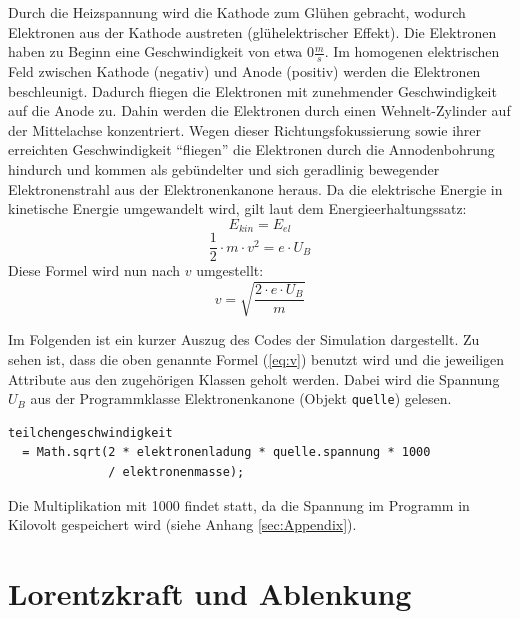 Durch die Heizspannung wird die Kathode zum Glühen gebracht, wodurch Elektronen aus der Kathode austreten (glühelektrischer Effekt).
Die Elektronen haben zu Beginn eine Geschwindigkeit von etwa $0 \frac{m}{s}$.
Im homogenen elektrischen Feld zwischen Kathode (negativ) und Anode (positiv) werden die Elektronen beschleunigt.
Dadurch fliegen die Elektronen mit zunehmender Geschwindigkeit auf die Anode zu.
Dahin werden die Elektronen durch einen Wehnelt-Zylinder auf der Mittelachse konzentriert.
Wegen dieser Richtungsfokussierung sowie ihrer erreichten Geschwindigkeit "`fliegen"' die Elektronen durch die Annodenbohrung hindurch und kommen als gebündelter und sich geradlinig bewegender Elektronenstrahl aus der Elektronenkanone heraus.
Da die elektrische Energie in kinetische Energie umgewandelt wird, gilt laut dem Energieerhaltungssatz:
\begin{equation}
\label{eq:Energie}
   E_{kin} = E_{el}  
\end{equation}
$$ \frac{1}{2} \cdot m \cdot v^2 = e \cdot U_B$$
Diese Formel wird  nun nach $v$ umgestellt:
\begin{equation}
\label{eq:v}
   v = \sqrt{\frac{2 \cdot e \cdot U_B}{m}} 
\end{equation}

Im Folgenden ist ein kurzer Auszug des Codes der Simulation dargestellt.
Zu sehen ist, dass die oben genannte Formel (\ref{eq:v}) benutzt wird und die jeweiligen Attribute aus den zugehörigen Klassen geholt werden.
Dabei wird die Spannung $U_B$ aus der Programmklasse Elektronenkanone (Objekt \lstinline$quelle$) gelesen.

\begin{lstlisting}
teilchengeschwindigkeit 
  = Math.sqrt(2 * elektronenladung * quelle.spannung * 1000 
              / elektronenmasse);
\end{lstlisting}
Die Multiplikation mit 1000 findet statt, da die Spannung im Programm in Kilovolt gespeichert wird (siehe Anhang \ref{sec:Appendix}).
\section{Lorentzkraft und Ablenkung}
\label{sec:a}

